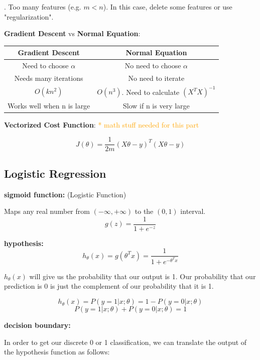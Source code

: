 \documentclass{article}
\begin{document}
. Too many features (e.g. \(m < n\)). In this case, delete some features or use "regularization".

\bigskip

\noindent \textbf{Gradient Descent} vs \textbf{Normal Equation}:

\begin{center}
\begin{tabular}{ | c | c | } 
\hline
\textbf{Gradient Descent} & \textbf{Normal Equation} \\ 
\hline
Need to choose \(\alpha\) & No need to choose \(\alpha\) \\ 
\hline
Needs many iterations & No need to iterate \\ 
\hline
\(O(kn^2)\) & \(O(n^3)\). Need to calculate \((X^TX)^{-1}\) \\ 
\hline
Works well when n is large & Slow if n is very large \\ 
\hline
\end{tabular}
\end{center}

\noindent \textbf{Vectorized Cost Function}: \textcolor{orange}{ * math stuff needed for this part}

\[J(\theta) = \frac{1}{2m} (X\theta - y)^T(X\theta - y)\]

\subsection{Logistic Regression}

\noindent \textbf{sigmoid function:} (Logistic Function)

\noindent Maps any real number from \((-\infty, +\infty)\) to the \((0, 1)\) interval.
\[g(z) = \frac{1}{1 + e^{-z}}\]

\noindent \textbf{hypothesis:}
\[
h_{\theta}(x) 
= g(\theta^T x)
= \frac{1}{1 + e^{-\theta^T x}}
\]

\noindent \(h_{\theta}(x)\) will give us the probability that our output is 1. Our probability that our prediction is 0 is just the complement of our probability that it is 1.

\[
h_{\theta} (x) 
= P(y = 1 | x ; \theta)
= 1 - P(y = 0 | x ; \theta)
\]
\[P(y = 1 | x ; \theta) + P(y = 0 | x ; \theta) = 1\]

\noindent \textbf{decision boundary:}

\noindent In order to get our discrete 0 or 1 classification, we can translate the output of the hypothesis function as follows:
\end{document}
